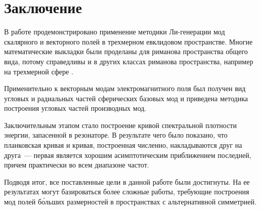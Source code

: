 %
%
%
%
%
%

\section{Заключение}

    В работе продемонстрировано применение методики Ли-генерации мод скалярного и векторного полей в трехмерном евклидовом пространстве. Многие математические выкладки были проделаны для риманова пространства общего вида, потому справедливы и в других классах риманова пространства, например на трехмерной сфере \cite{burlankov_tmf}.

    Применительно к векторным модам электромагнитного поля был получен вид угловых и радиальных частей сферических базовых мод и приведена методика построения угловых частей производных мод.

    Заключительным этапом стало построение кривой спектральной плотности энергии, запасенной в резонаторе. В результате чего было показано, что планковская кривая и кривая, построенная численно, накладываются друг на друга~--- первая является хорошим асимптотическим приближением последней, причем практически во всем диапазоне частот.

    Подводя итог, все поставленные цели в данной работе были достигнуты. На ее результатах могут базироваться более сложные работы, требующие построения мод полей б\'{о}льших размерностей в пространствах с альтернативной симметрией.
